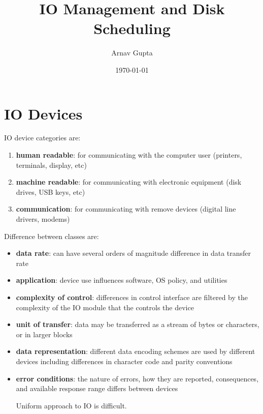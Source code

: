 \documentclass[11pt]{article}
\author{Arnav Gupta}
\date{\today}
\title{IO Management and Disk Scheduling}
\begin{document}
\maketitle
\tableofcontents

\section{IO Devices}
\label{sec:orgcdac499}
IO device categories are:
\begin{enumerate}
\item \textbf{human readable}: for communicating with the computer user (printers, terminals, display, etc)
\item \textbf{machine readable}: for communicating with electronic equipment (disk drives, USB keys, etc)
\item \textbf{communication}: for communicating with remove devices (digital line drivers, modems)
\end{enumerate}

Difference between classes are:
\begin{itemize}
\item \textbf{data rate}: can have several orders of magnitude difference in data transfer rate
\item \textbf{application}: device use influences software, OS policy, and utilities
\item \textbf{complexity of control}: differences in control interface are filtered by the complexity
of the IO module that the controls the device
\item \textbf{unit of transfer}: data may be transferred as a stream of bytes or characters, or in
larger blocks
\item \textbf{data representation}: different data encoding schemes are used by different devices
including differences in character code and parity conventions
\item \textbf{error conditions}: the nature of errors, how they are reported, consequences, and available
response range differs between devices

Uniform approach to IO is difficult.
\end{itemize}
\end{document}
